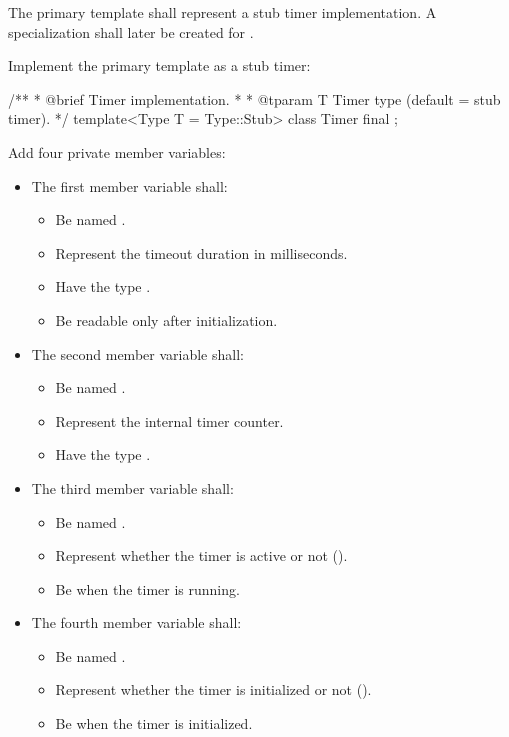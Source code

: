 The primary template shall represent a stub timer implementation. A specialization shall later be
created for .

\begin{parts}
  \item Implement the primary template as a stub timer:
\begin{cppcode}
/**
 * @brief Timer implementation.
 *
 * @tparam T Timer type (default = stub timer).
 */
template<Type T = Type::Stub>
class Timer final
{
};
\end{cppcode}

  \item Add four private member variables:
  \begin{itemize}
    \item The first member variable shall:
    \begin{itemize}
      \item Be named .
      \item Represent the timeout duration in milliseconds.
      \item Have the type .
      \item Be readable only after initialization.
    \end{itemize}
    \item The second member variable shall:
    \begin{itemize}
      \item Be named .
      \item Represent the internal timer counter.
      \item Have the type .
    \end{itemize}
    \item The third member variable shall:
    \begin{itemize}
      \item Be named .
      \item Represent whether the timer is active or not ().
      \item Be  when the timer is running.
    \end{itemize}
    \item The fourth member variable shall:
    \begin{itemize}
      \item Be named .
      \item Represent whether the timer is initialized or not ().
      \item Be  when the timer is initialized.
    \end{itemize}
  \end{itemize}


\end{parts}
